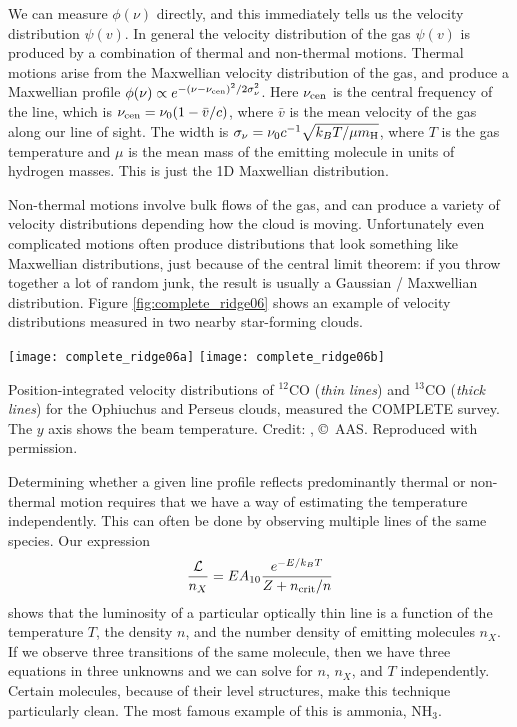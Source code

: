 We can measure $\phi(\nu)$ directly, and this immediately tells us the velocity distribution $\psi(v)$. In general the velocity distribution of the gas $\psi(v)$ is produced by a combination of thermal and non-thermal motions. Thermal motions arise from the Maxwellian velocity distribution of the gas, and produce a Maxwellian profile $\phi(\nu)\propto e^{-(\nu-\nu_{\rm cen})^2/2\sigma_\nu^2}$. Here $\nu_{\rm cen}$ is the central frequency of the line, which is $\nu_{\rm cen} = \nu_0 (1 - \bar{v}/c)$, where $\bar{v}$ is the mean velocity of the gas along our line of sight. The width is $\sigma_\nu = \nu_0 c^{-1}\sqrt{k_B T/\mu m_{\rm H}}$, where $T$ is the gas temperature and $\mu$ is the mean mass of the emitting molecule in units of hydrogen masses. This is just the 1D Maxwellian distribution.

Non-thermal motions involve bulk flows of the gas, and can produce a variety of velocity distributions depending how the cloud is moving. Unfortunately even complicated motions often produce distributions that look something like Maxwellian distributions, just because of the central limit theorem: if you throw together a lot of random junk, the result is usually a Gaussian / Maxwellian distribution. Figure \ref{fig:complete_ridge06} shows an example of velocity distributions measured in two nearby star-forming clouds.

\begin{marginfigure}
\texttt{[image: complete\_ridge06a]}
\texttt{[image: complete\_ridge06b]}
\caption[COMPLETE spectra of Ophiuchus and Perseus]{
\label{fig:complete_ridge06}
Position-integrated velocity distributions of $^{12}$CO (\textit{thin lines}) and $^{13}$CO (\textit{thick lines}) for the Ophiuchus and Perseus clouds, measured the COMPLETE survey. The $y$ axis shows the beam temperature. Credit: \citet{ridge06a}, \copyright\, AAS. Reproduced with permission.
}
\end{marginfigure}

Determining whether a given line profile reflects predominantly thermal or non-thermal motion requires that we have a way of estimating the temperature independently. This can often be done by observing multiple lines of the same species. Our expression
\begin{equation}
\frac{\mathcal{L}}{n_X} = E A_{10} \frac{e^{-E/k_B T}}{Z + n_{\rm crit}/n}
\end{equation}
shows that the luminosity of a particular optically thin line is a function of the temperature $T$, the density $n$, and the number density of emitting molecules $n_X$. If we observe three transitions of the same molecule, then we have three equations in three unknowns and we can solve for $n$, $n_X$, and $T$ independently. Certain molecules, because of their level structures, make this technique particularly clean. The most famous example of this is ammonia, NH$_3$.

